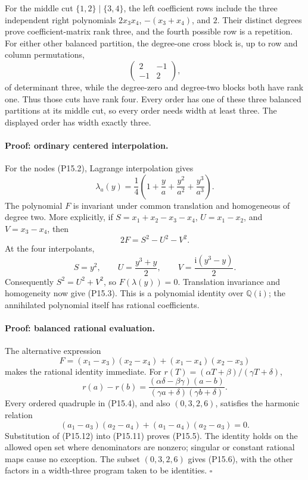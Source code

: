 \documentclass[11pt,a4paper]{article}
\theoremstyle{definition}\newtheorem{definition}{Definition}
\begin{document}
For the middle cut $\{1,2\}\mid\{3,4\}$, the left coefficient
rows include the three independent right polynomials
$2x_3x_4$, $-(x_3+x_4)$, and $2$. Their distinct degrees prove
coefficient-matrix rank three, and the fourth possible row is
a repetition. For either other balanced partition, the
degree-one cross block is, up to row and column permutations,
\[
 \begin{pmatrix}2&-1\\-1&2\end{pmatrix},
\]
of determinant three, while the degree-zero and degree-two
blocks both have rank one. Thus those cuts have rank four.
Every order has one of these three balanced partitions at its
middle cut, so every order needs width at least three. The
displayed order has width exactly three.

\paragraph{Proof: ordinary centered interpolation.}
For the nodes (P15.2), Lagrange interpolation gives
\[
 \lambda_a(y)=\frac14
    \left(1+\frac{y}{a}+\frac{y^2}{a^2}+\frac{y^3}{a^3}\right).
 \tag{P15.9}
\]
The polynomial $F$ is invariant under common translation and
homogeneous of degree two. More explicitly, if
$S=x_1+x_2-x_3-x_4$, $U=x_1-x_2$, and $V=x_3-x_4$, then
\[
 2F=S^2-U^2-V^2.
 \tag{P15.10}
\]
At the four interpolants,
\[
 S=y^2,\qquad U=\frac{y^3+y}{2},\qquad
 V=\frac{\mathrm i(y^3-y)}2.
\]
Consequently $S^2=U^2+V^2$, so $F(\lambda(y))=0$.
Translation invariance and homogeneity now give (P15.3).
This is a polynomial identity over $\mathbb Q(\mathrm i)$;
the annihilated polynomial itself has rational coefficients.

\paragraph{Proof: balanced rational evaluation.}
The alternative expression
\[
 F=(x_1-x_3)(x_2-x_4)+(x_1-x_4)(x_2-x_3)
 \tag{P15.11}
\]
makes the rational identity immediate. For
$r(T)=(\alpha T+\beta)/(\gamma T+\delta)$,
\[
 r(a)-r(b)=
 \frac{(\alpha\delta-\beta\gamma)(a-b)}
      {(\gamma a+\delta)(\gamma b+\delta)}.
 \tag{P15.12}
\]
Every ordered quadruple in (P15.4), and also $(0,3,2,6)$,
satisfies the harmonic relation
\[
 (a_1-a_3)(a_2-a_4)+(a_1-a_4)(a_2-a_3)=0.
 \tag{P15.13}
\]
Substitution of (P15.12) into (P15.11) proves (P15.5).
The identity holds on the allowed open set where denominators
are nonzero; singular or constant rational maps cause no
exception. The subset $(0,3,2,6)$ gives (P15.6), with the
other factors in a width-three program taken to be identities.
$\square$
\end{document}
